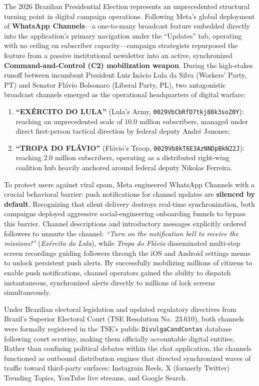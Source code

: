 \documentclass[preprint,12pt]{elsarticle}
\begin{document}
The 2026 Brazilian Presidential Election represents an unprecedented structural turning point in digital campaign operations. Following Meta's global deployment of \textbf{WhatsApp Channels}---a one-to-many broadcast feature embedded directly into the application's primary navigation under the ``Updates'' tab, operating with no ceiling on subscriber capacity---campaign strategists repurposed the feature from a passive institutional newsletter into an active, synchronized \textbf{Command-and-Control (C2) mobilization weapon}. During the high-stakes runoff between incumbent President Luiz Inácio Lula da Silva (Workers' Party, PT) and Senator Flávio Bolsonaro (Liberal Party, PL), two antagonistic broadcast channels emerged as the operational headquarters of digital warfare:
\begin{enumerate}
    \item \textbf{``EXÉRCITO DO LULA''} (Lula's Army, \texttt{0029VbCbRfD7tkj88k3soZ0Y}): reaching an unprecedented scale of $10.0\text{ million}$ subscribers, managed under direct first-person tactical direction by federal deputy André Janones;
    \item \textbf{``TROPA DO FLÁVIO''} (Flávio's Troop, \texttt{0029Vb8kT6E3AzNNDpBkN22J}): reaching $2.0\text{ million}$ subscribers, operating as a distributed right-wing coalition hub heavily anchored around federal deputy Nikolas Ferreira.
\end{enumerate}

To protect users against viral spam, Meta engineered WhatsApp Channels with a crucial behavioral barrier: push notifications for channel updates are \textbf{silenced by default}. Recognizing that silent delivery destroys real-time synchronization, both campaigns deployed aggressive social-engineering onboarding funnels to bypass this barrier. Channel descriptions and introductory messages explicitly ordered followers to unmute the channel: \textit{``Turn on the notification bell to receive the missions!''} (\textit{Exército do Lula}), while \textit{Tropa do Flávio} disseminated multi-step screen recordings guiding followers through the iOS and Android settings menus to unlock persistent push alerts. By successfully mobilizing millions of citizens to enable push notifications, channel operators gained the ability to dispatch instantaneous, synchronized alerts directly to millions of lock screens simultaneously.

Under Brazilian electoral legislation and updated regulatory directives from Brazil's Superior Electoral Court (TSE Resolution No.\ 23.610), both channels were formally registered in the TSE's public \texttt{DivulgaCandContas} database following court scrutiny, making them officially accountable digital entities. Rather than confining political debates within the chat application, the channels functioned as outbound distribution engines that directed synchronized waves of traffic toward third-party surfaces: Instagram Reels, X (formerly Twitter) Trending Topics, YouTube live streams, and Google Search.
\end{document}
